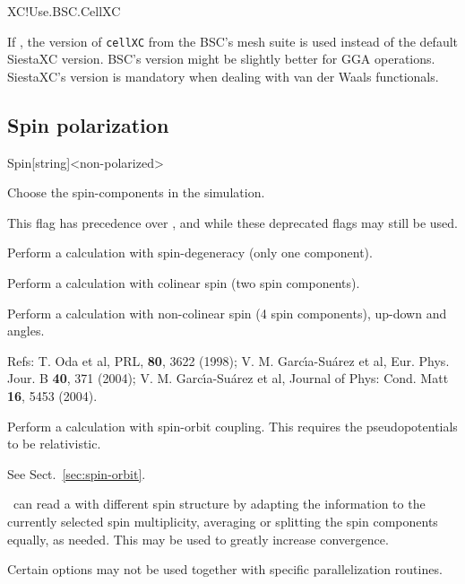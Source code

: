 \begin{fdflogicalF}{XC!Use.BSC.CellXC}

  If \fdftrue, the version of \texttt{cellXC} from the BSC's mesh
  suite is used instead of the default SiestaXC version. BSC's version
  might be slightly better for GGA operations. SiestaXC's version is
  mandatory when dealing with van der Waals functionals.

\end{fdflogicalF}


\subsection{Spin polarization}


\begin{fdfentry}{Spin}[string]<non-polarized>

  Choose the spin-components in the simulation.

  \note This flag has precedence over ,  and
   while these deprecated flags may still be used.
  \begin{fdfoptions}

    Perform a calculation with spin-degeneracy (only one component).

    \option[polarized]%
    Perform a calculation with colinear spin (two spin components).

    Perform a calculation with non-colinear spin (4 spin components),
    up-down and angles.

    Refs: T. Oda et al, PRL, \textbf{80}, 3622 (1998); 
    V. M. Garc\'{\i}a-Su\'arez et al, Eur. Phys. Jour. B \textbf{40}, 371 (2004);
    V. M. Garc\'{\i}a-Su\'arez et al, Journal of
    Phys: Cond. Matt \textbf{16}, 5453 (2004).

    Perform a calculation with spin-orbit coupling.  This requires the
    pseudopotentials to be relativistic.

    See Sect.~\ref{sec:spin-orbit}.

  \end{fdfoptions}

  \siesta\ can read a  with different spin structure by
  adapting the information to the currently selected spin
  multiplicity, averaging or splitting the spin components equally, as
  needed. This may be used to greatly increase convergence.

  Certain options may not be used together with specific
  parallelization routines.

\end{fdfentry}

